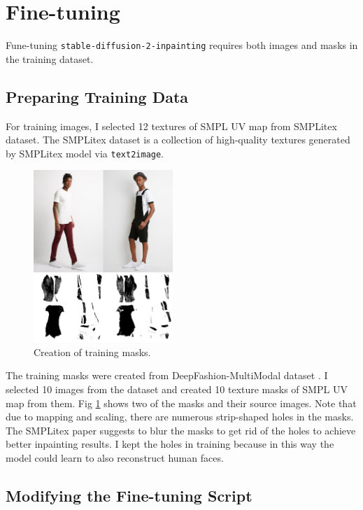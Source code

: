 \documentclass[acmtog]{acmart}
\begin{document}
\section{Fine-tuning}

Fune-tuning \texttt{stable-diffusion-2-inpainting} requires both images and masks in the training dataset.

\subsection{Preparing Training Data}

For training images, I selected 12 textures of SMPL UV map from SMPLitex dataset. The SMPLitex dataset is a collection of high-quality textures generated by SMPLitex model via \texttt{text2image}.

\begin{figure}[h]
  \centering
  \includegraphics[width=0.47\textwidth]{figs/training_mask.png}
  \caption{Creation of training masks.}
  \label{fig:train_mask}
\end{figure}

The training masks were created from DeepFashion-MultiModal dataset \cite{jiang2022text2human}. I selected 10 images from the dataset and created 10 texture masks of SMPL UV map from them. Fig \ref{fig:train_mask} shows two of the masks and their source images. Note that due to mapping and scaling, there are numerous strip-shaped holes in the masks. The SMPLitex paper suggests to blur the masks to get rid of the holes to achieve better inpainting results. I kept the holes in training because in this way the model could learn to also reconstruct human faces.

\subsection{Modifying the Fine-tuning Script}
\end{document}
